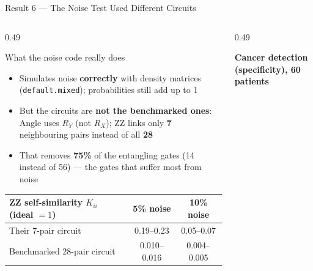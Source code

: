 \documentclass[aspectratio=169,11pt,t,xcolor={table}]{beamer}
\begin{document}
\begin{frame}{Result 6 --- The Noise Test Used Different Circuits}
  \begin{columns}[T,onlytextwidth]
    \begin{column}{0.49\textwidth}
      \begin{block}{What the noise code really does}
        \footnotesize
        \begin{itemize}\setlength{\itemsep}{2pt}
          \item Simulates noise \textbf{correctly} with density matrices (\texttt{default.mixed}); probabilities still add up to 1
          \item But the circuits are \textbf{not the benchmarked ones}: Angle uses $R_Y$ (not $R_X$); ZZ links only \textbf{7} neighbouring pairs instead of all \textbf{28}
          \item That removes \textbf{75\%} of the entangling gates (14 instead of 56) --- the gates that suffer most from noise
        \end{itemize}
      \end{block}
      \scriptsize\setlength{\tabcolsep}{3pt}
      \begin{tabular}{@{}lcc@{}}
        \toprule
        ZZ self-similarity $K_{ii}$ (ideal $=1$) & 5\% noise & 10\% noise \\
        \midrule
        Their 7-pair circuit      & 0.19--0.23 & 0.05--0.07 \\
        Benchmarked 28-pair circuit & 0.010--0.016 & 0.004--0.005 \\
        \bottomrule
      \end{tabular}
    \end{column}
    \begin{column}{0.49\textwidth}
      \centering
      {\footnotesize\bfseries Cancer detection (specificity), 60 patients\par}\vspace{1mm}
\end{column}
\end{columns}
\end{frame}
\end{document}
